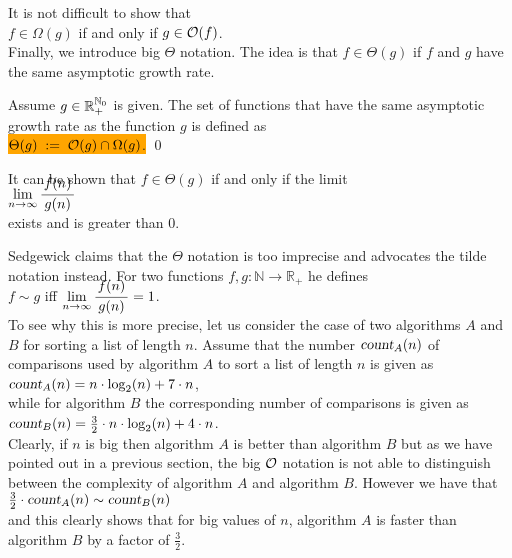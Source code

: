 It is not difficult to show that
\\[0.2cm]
\hspace*{1.3cm}
 $f \in \Omega(g)$ \quad if and only if \quad $g \in \mathcal{O}(f)$.
\\[0.2cm]
Finally, we introduce big $\Theta$ notation.  The idea is that $f \in \Theta(g)$ if 
$f$ and $g$ have the same asymptotic growth rate. 

\begin{Definition}[$\Theta(g)$]
  Assume $g \in {\mathbb R}_+^{{\mathbb N}_0}$ is given.   The set of functions that have the same asymptotic growth rate
  as the function $g$ is defined as
  \\[0.2cm]
  \hspace*{0.5cm} 
  \colorbox{orange}{
  $ \Theta(g) \;:=\; \mathcal{O}(g) \cap \Omega(g)$.}
  \qed 
\end{Definition}

\noindent
It can be shown that $f \in \Theta(g)$ if and only if the limit
\\[0.4cm]
\hspace*{1.3cm}
$\lim\limits_{n \rightarrow \infty} \bruch{f(n)}{g(n)}$
\\[0.2cm]
exists and is greater than $0$.
\vspace*{0.3cm}

Sedgewick \cite{sedgewick:11} claims that the $\Theta$ notation is too imprecise and advocates the
tilde notation instead.  For two functions $f,g : \mathbb{N} \rightarrow \mathbb{R}_+$ he defines
\\[0.3cm]
\hspace*{1.3cm}
$f \sim g$ \quad iff \quad $\lim\limits_{n \rightarrow \infty} \bruch{f(n)}{g(n)} = 1$.
\\[0.2cm]
To see why this is more precise, let us consider the case of two algorithms $A$ and $B$ for sorting a list of length
$n$.   Assume that the number $\textsl{count}_A(n)$ of comparisons used by algorithm $A$ to sort a list of
length $n$ is given as
\\[0.2cm]
\hspace*{1.3cm}
$\textsl{count}_A(n) = n \cdot \log_2(n) + 7 \cdot n$,
\\[0.2cm]
while for algorithm $B$ the corresponding number of comparisons is given as
\\[0.2cm]
\hspace*{1.3cm}
$\textsl{count}_B(n) = \frac{3}{2} \cdot n \cdot \log_2(n) + 4 \cdot n$.
\\[0.2cm]
Clearly, if $n$ is big then algorithm $A$ is better than algorithm $B$ but as we have pointed out in a previous
section, the big $\mathcal{O}$ notation is not able to distinguish between the complexity of algorithm $A$ and
algorithm $B$.  However we have that
\\[0.2cm]
\hspace*{1.3cm}
$\frac{3}{2} \cdot \textsl{count}_A(n) \sim \textsl{count}_B(n)$
\\[0.2cm]
and this clearly shows that for big values of $n$, algorithm $A$ is faster than algorithm $B$ by a
factor of $\frac{3}{2}$.



